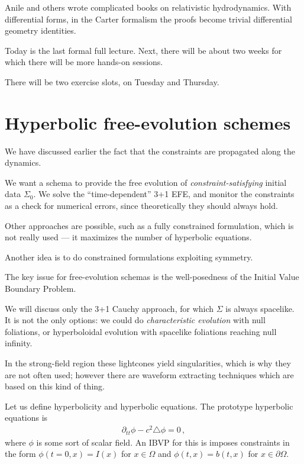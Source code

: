 \documentclass[main.tex]{subfiles}
\begin{document}

Anile and others wrote complicated books on relativistic hydrodynamics. 
With differential forms, in the Carter formalism the proofs become trivial differential geometry identities. 

Today is the last formal full lecture. 
Next, there will be about two weeks for which there will be more hands-on sessions. 

There will be two exercise slots, on Tuesday and Thursday. 

\section{Hyperbolic free-evolution schemes}

We have discussed earlier the fact that the constraints are propagated along the dynamics. 

We want a schema to provide the free evolution of \emph{constraint-satisfying} initial data \(\Sigma_0 \). 
We solve the ``time-dependent'' 3+1 EFE, and monitor the constraints as a check for numerical errors, since theoretically they should always hold.

Other approaches are possible, such as a fully constrained formulation, 
which is not really used --- it maximizes the number of hyperbolic equations. 

Another idea is to do constrained formulations exploiting symmetry. 

The key issue for free-evolution schemas is the well-posedness of the Initial Value Boundary Problem. 

We will discuss only the 3+1 Cauchy approach, for which \(\Sigma \) is always spacelike.
It is not the only options: we could do \emph{characteristic evolution} with null foliations, or hyperboloidal evolution with spacelike foliations reaching null infinity. 

In the strong-field region these lightcones yield singularities, which is why they are not often used; however there are waveform extracting techniques which are based on this kind of thing. 

Let us define hyperbolicity and hyperbolic equations. 
The prototype hyperbolic equations is 
%
\begin{align}
\partial_{tt} \phi - c^2 \triangle \phi = 0
\,,
\end{align}
%
where \(\phi \) is some sort of scalar field. An IBVP for this is imposes constraints in the form \(\phi (t= 0, x) = I(x)\) for \(x \in \Omega \) and \(\phi (t, x) = b(t, x)\) for \(x \in \partial \Omega \).
\end{document}
